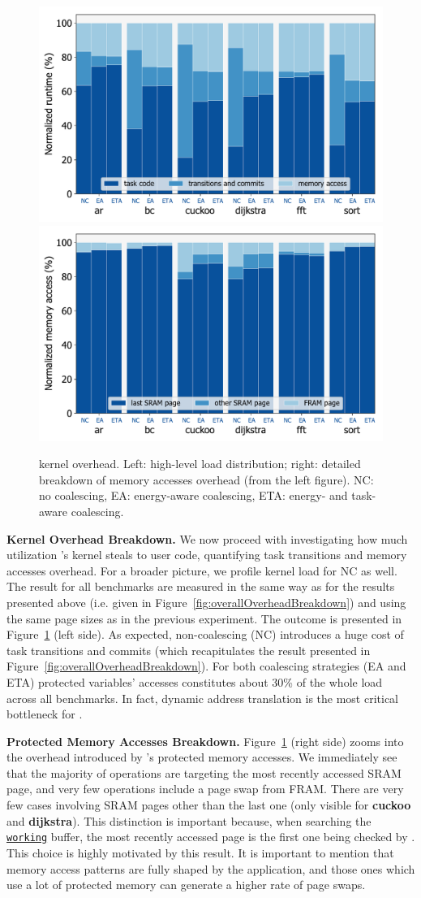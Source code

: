 \begin{figure}
	\centering
	\includegraphics[width=0.49\columnwidth]{figures/overallOverhead}
	\includegraphics[width=0.49\columnwidth]{figures/memAccess}
	\caption{\sys kernel overhead. Left: high-level load distribution; right: detailed breakdown of memory accesses overhead (from the left figure). NC: no coalescing, EA: energy-aware coalescing, ETA: energy- and task-aware coalescing. }
	\label{fig:coalEfficiency}
\end{figure}

\textbf{\sys Kernel Overhead Breakdown.} We now proceed with investigating how much utilization \sys's kernel steals to user code, quantifying task transitions and memory accesses overhead. For a broader picture, we profile kernel load for NC as well. The result for all benchmarks are measured in the same way as for the results presented above (i.e. given in Figure~\ref{fig:overallOverheadBreakdown}) and using the same page sizes as in the previous experiment. The outcome is presented in Figure~\ref{fig:coalEfficiency} (left side). As expected, non-coalescing (NC) \sys introduces a huge cost of task transitions and commits (which recapitulates the result presented in Figure~\ref{fig:overallOverheadBreakdown}). For both coalescing strategies (EA and ETA) protected variables' accesses constitutes about 30\% of the whole load across all benchmarks. In fact, dynamic address translation is the most critical bottleneck for \sys.

\textbf{Protected Memory Accesses Breakdown.} Figure~\ref{fig:coalEfficiency} (right side) zooms into the overhead introduced by \sys's protected memory accesses. We immediately see that the majority of operations are targeting the most recently accessed SRAM page, and very few operations include a page swap from FRAM. There are very few cases involving SRAM pages other than the last one (only visible for \textbf{cuckoo} and \textbf{dijkstra}). This distinction is important because, when searching the \texttt{\underline{working}} buffer, the most recently accessed page is the first one being checked by \sys. This choice is highly motivated by this result. It is important to mention that memory access patterns are fully shaped by the application, and those ones which use a lot of protected memory can generate a higher rate of page swaps.


